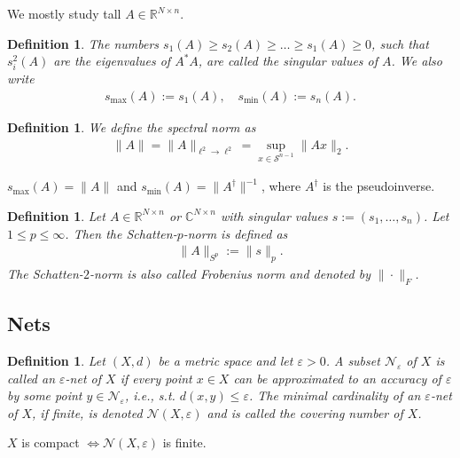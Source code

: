\documentclass[13pt]{article}
\theoremstyle{plain}
\newtheorem{defi}[thm]{Definition}
\newcommand{\R}{\mathbb{R}}
\newcommand{\C}{\mathbb{C}}
\newcommand{\NN}{\mathcal{N}}
\renewcommand{\S}{\mathcal{S}}
\begin{document}
We mostly study tall $A \in \R^{N \times n}$.

\begin{defi}
    The numbers $s_1(A) \ge s_2(A) \ge \ldots \ge s_1(A) \ge 0$, such that
    $s_i^2(A)$ are the eigenvalues of $A^\ast A$, are called the \emph{singular values} of $A$.
    We also write
    \[
        \begin{aligned}
            s_{\max}(A) := s_1(A), \quad s_{\min}(A) := s_n(A) .
        \end{aligned}
    \]
\end{defi}

\begin{defi}
    We define the \emph{spectral norm} as
    \[
        \begin{aligned}
            \|A\| = \|A\|_{\ell^2 \to \ell^2} = \sup_{x \in \S^{n-1}} \|Ax\|_2.
        \end{aligned}
    \]
\end{defi}

$s_{\max}(A) = \|A\|$ and $s_{\min}(A) = \|A^\dagger\|^{-1}$, where $A^\dagger$ is the pseudoinverse.

\begin{defi}
    Let $A \in \R^{N \times n}$ or $\C^{N \times n}$ with singular values $s := (s_1,\ldots,s_n)$.
    Let $1 \le p \le \infty$. Then the \emph{Schatten-$p$-norm} is defined as
    \[
        \begin{aligned}
            \|A\|_{S^p} := \|s\|_p.
        \end{aligned}
    \]
    The Schatten-$2$-norm is also called \emph{Frobenius norm} and denoted by $\|\cdot\|_F$.
\end{defi}

\subsection{Nets}

\begin{defi}
    Let $(X,d)$ be a metric space and let $\varepsilon > 0$.
    A subset $\NN_\varepsilon$ of $X$ is called an \emph{$\varepsilon$-net} of $X$ if
    every point $x \in X$ can be approximated to an accuracy of $\varepsilon$ by
    some point $y \in \NN_\varepsilon$, i.e., s.t. $d(x,y) \le \varepsilon$.
    The minimal cardinality of an $\varepsilon$-net of $X$, if finite, is
    denoted $\NN(X,\varepsilon)$ and is called the \emph{covering number} of $X$.
\end{defi}

$X$ is compact $\iff \NN(X,\varepsilon)$ is finite.
\end{document}
